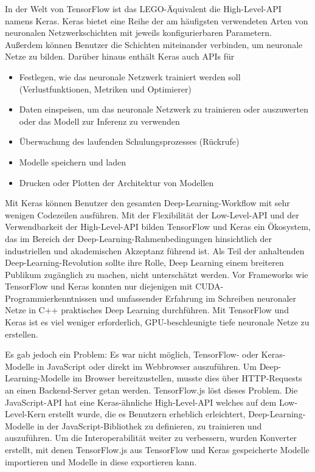 In der Welt von TensorFlow ist das LEGO-Äquivalent die High-Level-API namens Keras.  Keras bietet eine Reihe der am häufigsten verwendeten Arten von neuronalen Netzwerkschichten mit jeweils konfigurierbaren Parametern. Außerdem können Benutzer die Schichten miteinander verbinden, um neuronale Netze zu bilden. Darüber hinaus enthält Keras auch APIs für

\begin{itemize}
     \item Festlegen, wie das neuronale Netzwerk trainiert werden soll (Verlustfunktionen, Metriken und Optimierer)
     \item Daten einspeisen, um das neuronale Netzwerk zu trainieren oder auszuwerten oder das Modell zur Inferenz zu verwenden
     \item Überwachung des laufenden Schulungsprozesses (Rückrufe)
     \item Modelle speichern und laden
     \item Drucken oder Plotten der Architektur von Modellen
 \end{itemize}



Mit Keras können Benutzer den gesamten Deep-Learning-Workflow mit sehr wenigen Codezeilen ausführen. Mit der Flexibilität der Low-Level-API und der Verwendbarkeit der High-Level-API bilden TensorFlow und Keras ein Ökosystem, das im Bereich der Deep-Learning-Rahmenbedingungen hinsichtlich der industriellen und akademischen Akzeptanz führend ist. Als Teil der anhaltenden Deep-Learning-Revolution sollte ihre Rolle, Deep Learning einem breiteren Publikum zugänglich zu machen, nicht unterschätzt werden. Vor Frameworks wie TensorFlow und Keras konnten nur diejenigen mit CUDA-Programmierkenntnissen und umfassender Erfahrung im Schreiben neuronaler Netze in C++ praktisches Deep Learning durchführen. Mit TensorFlow und Keras ist es viel weniger erforderlich, GPU-beschleunigte tiefe neuronale Netze zu erstellen.

Es gab jedoch ein Problem: Es war nicht möglich, TensorFlow- oder Keras-Modelle in JavaScript oder direkt im Webbrowser auszuführen. Um Deep-Learning-Modelle im Browser bereitzustellen, musste dies über HTTP-Requests an einen Backend-Server getan werden. TensorFlow.js löst dieses Problem. Die JavaScript-API hat eine Keras-ähnliche High-Level-API welches auf dem Low-Level-Kern erstellt wurde, die es Benutzern erheblich erleichtert, Deep-Learning-Modelle in der JavaScript-Bibliothek zu definieren, zu trainieren und auszuführen. Um die Interoperabilität weiter zu verbessern, wurden Konverter erstellt, mit denen TensorFlow.js aus TensorFlow und Keras gespeicherte Modelle importieren und Modelle in diese exportieren kann.


